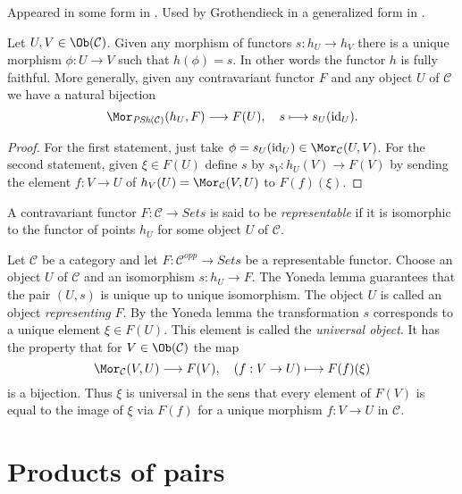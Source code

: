 \begin{lemma}
\label{lemma-yoneda}
\begin{reference}
Appeared in some form in \cite{Yoneda-homology}. Used by Grothendieck in a
generalized form in \cite{Gr-II}.
\end{reference}
Let $U, V \in \Ob(\mathcal{C})$.
Given any morphism of functors $s : h_U \to h_V$
there is a unique morphism $\phi : U \to V$
such that $h(\phi) = s$. In other words the
functor $h$ is fully faithful. More generally,
given any contravariant functor $F$ and any object
$U$ of $\mathcal{C}$ we have a natural bijection
$$
\Mor_{\textit{PSh}(\mathcal{C})}(h_U, F) \longrightarrow F(U),
\quad
s \longmapsto s_U(\text{id}_U).
$$
\end{lemma}

\begin{proof}
For the first statement, just take
$\phi = s_U(\text{id}_U) \in \Mor_\mathcal{C}(U, V)$.
For the second statement, given $\xi \in F(U)$ define
$s$ by $s_V : h_U(V) \to F(V)$ by sending the element $f : V \to U$
of $h_V(U) = \Mor_\mathcal{C}(V, U)$ to $F(f)(\xi)$.
\end{proof}

\begin{definition}
\label{definition-representable-functor}
A contravariant functor $F : \mathcal{C}\to \textit{Sets}$ is said
to be {\it representable} if it is isomorphic to the functor of
points $h_U$ for some object $U$ of $\mathcal{C}$.
\end{definition}

\noindent
Let $\mathcal{C}$ be a category and let
$F : \mathcal{C}^{opp} \to \textit{Sets}$ be a representable functor.
Choose an object $U$ of $\mathcal{C}$ and an isomorphism $s : h_U \to F$.
The Yoneda lemma guarantees that the pair $(U, s)$
is unique up to unique isomorphism. The object
$U$ is called an object {\it representing} $F$.
By the Yoneda lemma the transformation $s$ corresponds to a unique
element $\xi \in F(U)$. This element is called the {\it universal object}.
It has the property that for $V \in \Ob(\mathcal{C})$ the map
$$
\Mor_\mathcal{C}(V, U) \longrightarrow F(V),\quad
(f : V \to U) \longmapsto F(f)(\xi)
$$
is a bijection. Thus $\xi$ is universal in the sens that every element
of $F(V)$ is equal to the image of $\xi$ via $F(f)$ for a unique morphism
$f : V \to U$ in $\mathcal{C}$.






\section{Products of pairs}
\label{section-products-pairs}

